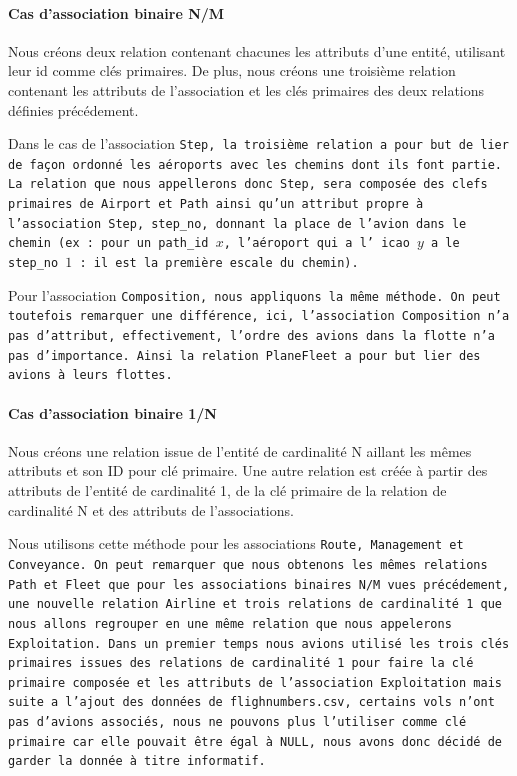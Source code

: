 \documentclass[a4paper, 11pt, twoside]{book}
\let\paragraphoriginal\paragraph
\renewcommand{\paragraph}[1]{\paragraphoriginal{#1}\mbox{}}
\begin{document}
\paragraph{Cas d'association binaire N/M}

Nous créons deux relation contenant chacunes les attributs d'une entité, utilisant leur id comme clés primaires.
De plus, nous créons une troisième relation contenant les attributs de l'association et les clés primaires des deux relations définies précédement.

Dans le cas de l'association \tt{Step}, la troisième relation a pour but de lier de façon ordonné les aéroports avec les chemins dont ils font partie. La relation que nous appellerons donc \tt{Step}, sera composée des clefs primaires de  \tt{Airport} et  \tt{Path} ainsi qu’un attribut propre à l’association  \tt{Step},  \tt{step\_no}, donnant la place de l’avion dans le chemin (ex : pour un  \tt{path\_id} $x$, l’aéroport qui a l' \tt{icao} $y$ a le \tt{step\_no} $1$ : il est la première escale du chemin).

Pour l'association  \tt{Composition}, nous appliquons la même méthode. On peut toutefois remarquer une différence, ici, l’association  \tt{Composition} n’a pas d’attribut, effectivement, l’ordre des avions dans la flotte n’a pas d’importance. Ainsi la relation  \tt{PlaneFleet} a pour but lier des avions à leurs flottes.

\paragraph{Cas d'association binaire 1/N}

Nous créons une relation issue de l'entité de cardinalité N aillant les mêmes attributs et son ID pour clé primaire. Une autre relation est créée à partir des attributs de l'entité de cardinalité 1, de la clé primaire de la relation de cardinalité N et des attributs de l'associations.

Nous utilisons cette méthode pour les associations  \tt{Route},  \tt{Management} et  \tt{Conveyance}.
On peut remarquer que nous obtenons les mêmes relations  \tt{Path} et  \tt{Fleet} que pour les associations binaires N/M vues précédement, une nouvelle relation  \tt{Airline} et trois relations de cardinalité 1 que nous allons regrouper en une même relation que nous appelerons  \tt{Exploitation}. Dans un premier temps nous avions utilisé les trois clés primaires issues des relations de cardinalité 1 pour faire la clé primaire composée et les attributs de l'association  \tt{Exploitation} mais suite a l'ajout des données de \tt{flighnumbers.csv}, certains vols n'ont pas d'avions associés, nous ne pouvons plus l'utiliser comme clé primaire car elle pouvait être égal à \tt{NULL}, nous avons donc décidé de garder la donnée à titre informatif.
\end{document}
